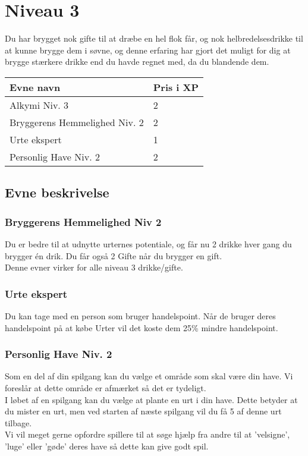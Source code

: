 \chapter{Niveau 3}
Du har brygget nok gifte til at dræbe en hel flok får, og nok helbredelsesdrikke til at kunne brygge dem i søvne, og denne erfaring har gjort det muligt for dig at brygge stærkere drikke end du havde regnet med, da du blandende dem.

\begin{table}[H]
    \centering
    \begin{tabular}{|p{}|p{}|}
    \rowcolor{cerulean!80}\hline
        Evne navn & Pris i XP \\\hline
        Alkymi Niv. 3 & 2\\\hline
        Bryggerens Hemmelighed Niv. 2 & 2\\\hline
        Urte ekspert & 1\\\hline
        Personlig Have Niv. 2 & 2\\
         \hline
    \end{tabular}
\end{table}
\section{Evne beskrivelse}



\subsection{Bryggerens Hemmelighed Niv 2}
Du er bedre til at udnytte urternes potentiale, og får nu 2 drikke hver gang du brygger én drik. Du får også 2 Gifte når du brygger en gift.\\
Denne evner virker for alle niveau 3 drikke/gifte.\\

\subsection{Urte ekspert}
Du kan tage med en person som bruger handelspoint. Når de bruger deres handelspoint på at købe Urter vil det koste dem 25\% mindre handelspoint.

\subsection{Personlig Have Niv. 2}
Som en del af din spilgang kan du vælge et område som skal være din have. Vi foreslår at dette område er afmærket så det er tydeligt.\\
I løbet af en spilgang kan du vælge at plante en urt i din have. Dette betyder at du mister en urt, men ved starten af næste spilgang vil du få 5 af denne urt tilbage.\\
Vi vil meget gerne opfordre spillere til at søge hjælp fra andre til at 'velsigne', 'luge' eller 'gøde' deres have så dette kan give godt spil.\\
